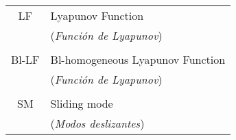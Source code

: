 \begin{tabular}{cl}
	LF		&\hspace{1.5cm} Lyapunov Function\\
			&\hspace{1.5cm} (\textit{Función de Lyapunov})\\\\
	Bl-LF	&\hspace{1.5cm} Bl-homogeneous Lyapunov Function\\
			&\hspace{1.5cm} (\textit{Función de Lyapunov})\\\\
	SM		&\hspace{1.5cm} Sliding mode\\
			&\hspace{1.5cm} (\textit{Modos deslizantes})	
\end{tabular}
